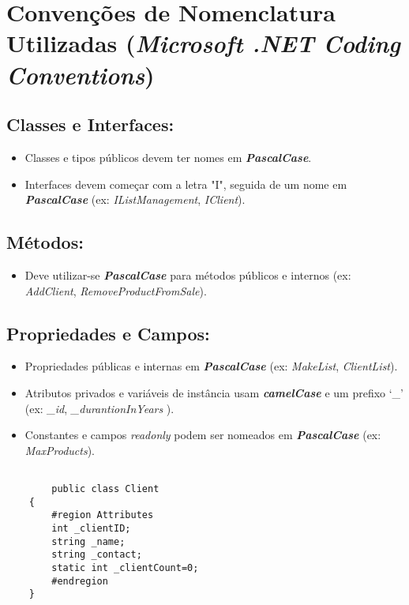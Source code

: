 \documentclass[11pt]{scrartcl} %
\begin{document}
\newpage

\section{Convenções de Nomenclatura Utilizadas (\textit{Microsoft .NET Coding Conventions})}

\subsection{Classes e Interfaces:}
\begin{itemize}
	\item Classes e tipos públicos devem ter nomes em \textbf{\textit{PascalCase}}.
	\item Interfaces devem começar com a letra "I", seguida de um nome em \textbf{\textit{PascalCase}} (ex: \textit{IListManagement}, \textit{IClient}).
\end{itemize}

\subsection{Métodos:}
\begin{itemize}
	\item Deve utilizar-se \textbf{\textit{PascalCase}} para métodos públicos e internos (ex: \textit{AddClient}, \textit{RemoveProductFromSale}).
\end{itemize}

\subsection{Propriedades e Campos:}
\begin{itemize}
	\item Propriedades públicas e internas em \textbf{\textit{PascalCase}} (ex: \textit{MakeList}, \textit{ClientList}).
	\item Atributos privados e variáveis de instância usam \textbf{\textit{camelCase}} e um prefixo ‘\_’ (ex: \textit{\_id}, \textit{\_durantionInYears} ).
	\item Constantes e campos \textit{readonly} podem ser nomeados em \textbf{\textit{PascalCase}} (ex: \textit{MaxProducts}).
\end{itemize}

\begin{lstlisting}[language={[Sharp]C}, caption={A Classe Cliente}, label={Classe Cliente}]
	
		public class Client
	{
		#region Attributes
		int _clientID;
		string _name;
		string _contact;
		static int _clientCount=0;
		#endregion
	}
	
\end{lstlisting}
\end{document}
